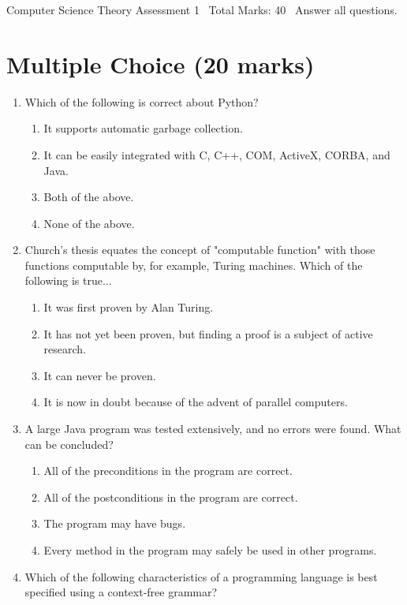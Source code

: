 \documentclass[12pt]{article}
\begin{document}
\begin{center}
Computer Science Theory Assessment 1 \
Total Marks: 40 \
Answer all questions.
\end{center}

\section*{Multiple Choice (20 marks)}
\begin{enumerate}[label=\arabic*.]
\item Which of the following is correct about Python?
\begin{enumerate}[label=(\alph*)]
    \item It supports automatic garbage collection.
    \item It can be easily integrated with C, C++, COM, ActiveX, CORBA, and Java.
    \item Both of the above.
    \item None of the above.
\end{enumerate}
\item Church's thesis equates the concept of "computable function" with those functions computable by, for example, Turing machines. Which of the following is true...
\begin{enumerate}[label=(\alph*)]
    \item It was first proven by Alan Turing.
    \item It has not yet been proven, but finding a proof is a subject of active research.
    \item It can never be proven.
    \item It is now in doubt because of the advent of parallel computers.
\end{enumerate}
\item A large Java program was tested extensively, and no errors were found. What can be concluded?
\begin{enumerate}[label=(\alph*)]
    \item All of the preconditions in the program are correct.
    \item All of the postconditions in the program are correct.
    \item The program may have bugs.
    \item Every method in the program may safely be used in other programs.
\end{enumerate}
\item Which of the following characteristics of a programming language is best specified using a context-free grammar?

\end{enumerate}
\end{document}

